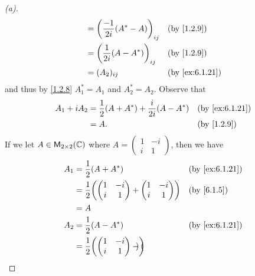 \begin{proof}[(a)]
\begin{align*}
		                                                  & = \pa{\frac{-1}{2i} (A^* - A)}_{i j}                  &  & \by{1.2.9}     \\
		                                                  & = \pa{\frac{1}{2i} (A - A^*)}_{i j}                   &  & \by{1.2.9}     \\
		                                                  & = (A_2)_{i j}                                         &  & \by{ex:6.1.21}
	\end{align*}
	and thus by \cref{1.2.8} \(A_1^* = A_1\) and \(A_2^* = A_2\).
	Observe that
	\begin{align*}
		A_1 + i A_2 & = \frac{1}{2} (A + A^*) + \frac{i}{2i} (A - A^*) &  & \by{ex:6.1.21} \\
		            & = A.                                             &  & \by{1.2.9}
	\end{align*}
	If we let \(A \in \mathsf{M}_{{2} \times 2}({\mathbb{C}})\) where \(A = \begin{pmatrix}
		1 & -i \\
		i & 1
	\end{pmatrix}\), then we have
	\begin{align*}
		A_1          & = \frac{1}{2} (A + A^*)           &  & \by{ex:6.1.21}            \\
		             & = \frac{1}{2} \pa{\begin{pmatrix}
				                                 1 & -i \\
				                                 i & 1
			                                 \end{pmatrix} + \begin{pmatrix}
				                                                 1 & -i \\
				                                                 i & 1
			                                                 \end{pmatrix}} &  & \by{6.1.5} \\
		             & = A                                                              \\
		A_2          & = \frac{1}{2} (A - A^*)           &  & \by{ex:6.1.21}            \\
		             & = \frac{1}{2} \pa{\begin{pmatrix}
				                                 1 & -i \\
				                                 i & 1
			                                 \end{pmatrix} - \begin{pmatrix}

\end{pmatrix}}
\end{align*}
\end{proof}
